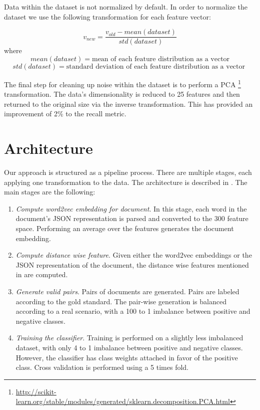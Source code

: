 Data within the dataset is not normalized by default. In order to normalize the
dataset we use the following transformation for each feature vector:

\[ v_{new} = \frac{v_{old} - mean(dataset)}{std(dataset)} \]
where
\[ mean(dataset) = \mbox{mean of each feature distribution as a vector} \]
\[ std(dataset) = \mbox{standard deviation of each feature distribution as a vector } \]

The final step for cleaning up noise within the dataset is to perform a PCA
\footnote{\url{http://scikit-learn.org/stable/modules/generated/sklearn.decomposition.PCA.html}}
transformation. The data's dimensionality is reduced to 25 features and then returned
to the original size via the inverse transformation. This has provided an
improvement of 2\% to the recall metric.


\section {Architecture}
\label{section:architecture}

Our approach is structured as a pipeline process. There are multiple stages, each
applying one transformation to the data. The architecture is described in
.
The main stages are the following:
\begin {enumerate}
\item
  {\em Compute word2vec embedding for document}. In this stage, each word in the
  document's JSON representation is parsed and converted to the 300 feature space.
  Performing an average over the features generates the document embedding.
\item
  {\em Compute distance wise feature}. Given either the word2vec embeddings or
  the JSON representation of the document, the distance wise features mentioned
  in  are computed.
\item
  {\em Generate valid pairs}. Pairs of documents are generated. Pairs are
  labeled according to the gold standard. The pair-wise generation is balanced
  according to a real scenario, with a 100 to 1 imbalance between positive
  and negative classes.
\item
  {\em Training the classifier}. Training is performed on a slightly less
  imbalanced dataset, with only 4 to 1 imbalance between positive and negative
  classes. However, the classifier has class weights attached in favor
  of the positive class. Cross validation is performed using a 5 times fold.
\end {enumerate}

